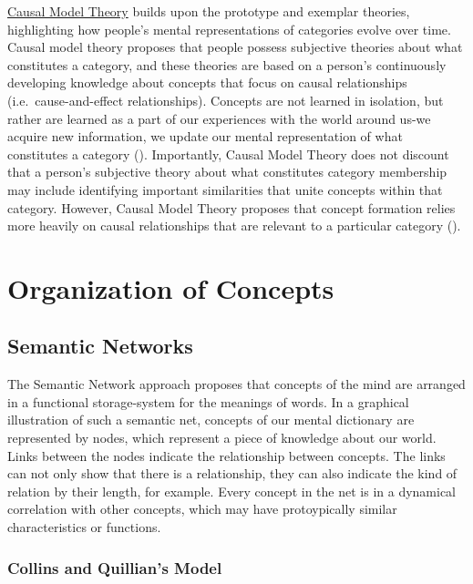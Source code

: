 \documentclass[
]{krantz}
\begin{document}
\hyperref[causal-model-theory]{Causal Model Theory} builds upon the prototype and exemplar theories, highlighting how people's mental representations of categories evolve over time. Causal model theory proposes that people possess subjective theories about what constitutes a category, and these theories are based on a person's continuously developing knowledge about concepts that focus on causal relationships (i.e.~cause-and-effect relationships). Concepts are not learned in isolation, but rather are learned as a part of our experiences with the world around us-we acquire new information, we update our mental representation of what constitutes a category (). Importantly, Causal Model Theory does not discount that a person's subjective theory about what constitutes category membership may include identifying important similarities that unite concepts within that category. However, Causal Model Theory proposes that concept formation relies more heavily on causal relationships that are relevant to a particular category ().

\section{Organization of Concepts}\label{organization-of-concepts}

\subsection*{Semantic Networks}\label{semantic-networks}


The Semantic Network approach proposes that concepts of the mind are arranged in a functional storage-system for the meanings of words. In a graphical illustration of such a semantic net, concepts of our mental dictionary are represented by nodes, which represent a piece of knowledge about our world. Links between the nodes indicate the relationship between concepts. The links can not only show that there is a relationship, they can also indicate the kind of relation by their length, for example. Every concept in the net is in a dynamical correlation with other concepts, which may have protoypically similar characteristics or functions.

\subsubsection*{Collins and Quillian's Model}\label{collins-and-quillians-model}
\end{document}
